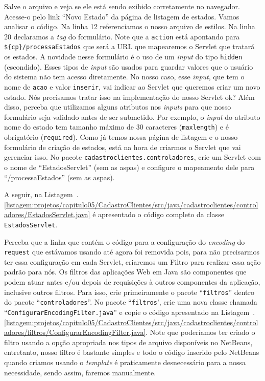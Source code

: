 Salve o arquivo e veja se ele está sendo exibido corretamente no navegador. Acesse-o pelo link ``Novo Estado'' da página de listagem de estados. Vamos analisar o código. Na linha 12 referenciamos o nosso arquivo de estilos. Na linha 20 declaramos a \textit{tag} do formulário. Note que a \texttt{action} está apontando para \texttt{\$\{cp\}/processaEstados} que será a URL que mapearemos o Servlet que tratará os estados. A novidade nesse formulário é o uso de um \textit{input} do tipo \texttt{hidden} (escondido). Esses tipos de \textit{input} são usados para guardar valores que o usuário do sistema não tem acesso diretamente. No nosso caso, esse \textit{input}, que tem o nome de \texttt{acao} e valor \texttt{inserir}, vai indicar ao Servlet que queremos criar um novo estado. Nós precisamos tratar isso na implementação do nosso Servlet ok? Além disso, perceba que utilizamos alguns atributos nos \textit{inputs} para que nosso formulário seja validado antes de ser submetido. Por exemplo, o \textit{input} do atributo nome do estado tem tamanho máximo de 30 caracteres (\texttt{maxlength}) e é obrigatório (\texttt{required}). Como já temos nossa página de listagem e o nosso formulário de criação de estados, está na hora de criarmos o Servlet que vai gerenciar isso. No pacote \texttt{cadastroclientes.controladores}, crie um Servlet com o nome de ``EstadosServlet'' (sem as aspas) e configure o mapeamento dele para ``/processaEstados'' (sem as aspas).

A seguir, na Listagem~\thechapter.\ref{listagem:projetos/capitulo05/CadastroClientes/src/java/cadastroclientes/controladores/EstadosServlet.java} é apresentado o código completo da classe \texttt{EstadosServlet}.


Perceba que a linha que contém o código para a configuração do \textit{encoding} do \texttt{request} que estávamos usando até agora foi removida pois, para não precisarmos ter essa configuração em cada Servlet, criaremos um Filtro para realizar essa ação padrão para nós. Os filtros das aplicações Web em Java são componentes que podem atuar antes e/ou depois de requisições à outros componentes da aplicação, inclusive outros filtros. Para isso, crie primeiramente o pacote ``\texttt{filtros}'' dentro do pacote\linebreak%
``\texttt{controladores}''. No pacote ``\texttt{filtros}', crie uma nova classe chamada\linebreak%
``\texttt{ConfigurarEncodingFilter.java}'' e copie o código apresentado na Listagem~\thechapter.\ref{listagem:projetos/capitulo05/CadastroClientes/src/java/cadastroclientes/controladores/filtros/ConfigurarEncodingFilter.java}. Note que poderíamos ter criado o filtro usando a opção apropriada nos tipos de arquivo disponíveis no NetBeans, entretanto, nosso filtro é bastante simples e todo o código inserido pelo NetBeans quando criamos usando o \textit{template} é praticamente desnecessário para a nossa necessidade, sendo assim, faremos manualmente.

